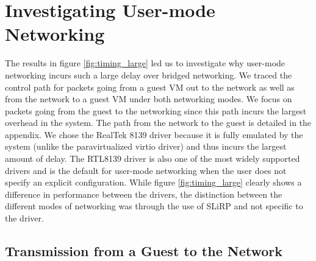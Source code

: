 \section{Investigating User-mode Networking}
\label{sec:trace}

The results in figure \ref{fig:timing_large} led us to investigate why user-mode networking incurs such a large delay over bridged networking.
We traced the control path for packets going from a guest VM out to the network as well as from the network to a guest VM under both networking modes.
We focus on packets going from the guest to the networking since this path incurs the largest overhead in the system.
The path from the network to the guest is detailed in the appendix. %
We chose the RealTek 8139 driver because it is fully emulated by the system (unlike the paravirtualized virtio driver) and thus incurs the largest amount of delay.
The RTL8139 driver is also one of the most widely supported drivers and is the default for user-mode networking when the user does not specify an explicit configuration.
While figure \ref{fig:timing_large} clearly shows a difference in performance between the drivers, the distinction between the different modes of networking was through the use of SLiRP and not specific to the driver.
%
%

\subsection{Transmission from a Guest to the Network}
\label{subsec:usermode}

